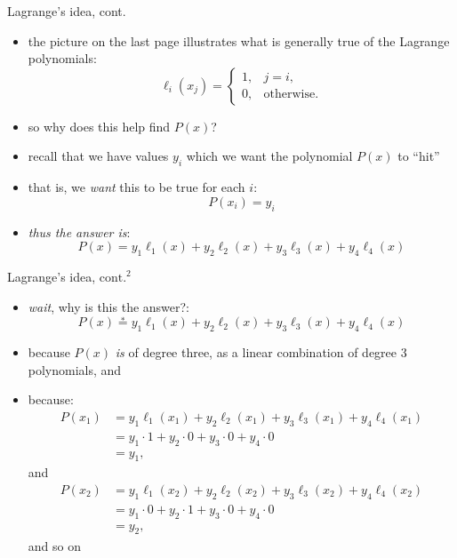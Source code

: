 \documentclass[10pt,hyperref]{beamer}
\begin{document}
\begin{frame}{Lagrange's idea, cont.}

\begin{itemize}
\item the picture on the last page illustrates what is generally true of the Lagrange polynomials:
	$$\ell_i(x_j) = \begin{cases}
   	                 1, & j = i, \\
   	                 0, & \text{otherwise}.
	                \end{cases}$$
\item so why does this help find $P(x)$?
\item recall that we have values $y_i$ which we want the polynomial $P(x)$ to ``hit''
\item that is, we \emph{want} this to be true for each $i$:
	$$P(x_i) = y_i$$
\item \emph{thus the answer is}:
	$$P(x) = y_1 \ell_1(x) + y_2 \ell_2(x) + y_3 \ell_3(x) + y_4 \ell_4(x)$$
\end{itemize}
\end{frame}


\begin{frame}{Lagrange's idea, $\text{cont.}^2$}

\begin{itemize}
\item \emph{wait}, why is this the answer?:
	$$P(x) \stackrel{\ast}{=} y_1 \ell_1(x) + y_2 \ell_2(x) + y_3 \ell_3(x) + y_4 \ell_4(x)$$
\item because $P(x)$ \emph{is} of degree three, as a linear combination of degree 3 polynomials, and
\item because:
\small
\begin{align*}
P(x_1) &= y_1 \ell_1(x_1) + y_2 \ell_2(x_1) + y_3 \ell_3(x_1) + y_4 \ell_4(x_1) \\
       &= y_1 \cdot 1 + y_2 \cdot 0 + y_3 \cdot 0 + y_4 \cdot 0 \\
       &= y_1,
\end{align*}
\normalsize
and
\small
\begin{align*}
P(x_2) &= y_1 \ell_1(x_2) + y_2 \ell_2(x_2) + y_3 \ell_3(x_2) + y_4 \ell_4(x_2) \\
       &= y_1 \cdot 0 + y_2 \cdot 1 + y_3 \cdot 0 + y_4 \cdot 0 \\
       &= y_2,
\end{align*}
\normalsize
and so on
\end{itemize}
\end{frame}
\end{document}
